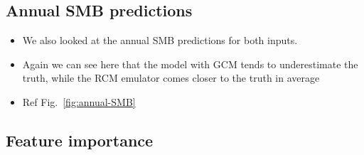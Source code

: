 \documentclass[a4paper,11pt,oneside]{report}
\begin{document}
\subsection{Annual SMB predictions}

\begin{itemize}
    \item We also looked at the annual SMB predictions for both inputs. 
    \item Again we can see here that the model with GCM tends to underestimate the truth, while the RCM emulator comes closer to the truth in average
    \item Ref Fig.~\ref{fig:annual-SMB}
\end{itemize}





\subsection{Feature importance}
\end{document}
